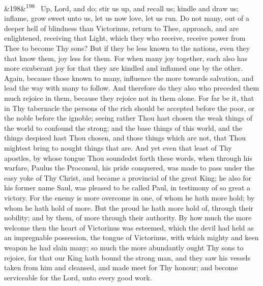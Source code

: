 \documentclass[12pt]{article}
\newcommand{\para}[1][]{\par\noindent\ifx&#1&\else\textsuperscript{\footnotesize #1}~\fi}
\begin{document}
\para[198] Up, Lord, and do; stir us up, and recall us; kindle and draw us; inflame, grow sweet unto us, let us now love, let us run. Do not many, out of a deeper hell of blindness than Victorinus, return to Thee, approach, and are enlightened, receiving that Light, which they who receive, receive power from Thee to become Thy sons? But if they be less known to the nations, even they that know them, joy less for them. For when many joy together, each also has more exuberant joy for that they are kindled and inflamed one by the other. Again, because those known to many, influence the more towards salvation, and lead the way with many to follow. And therefore do they also who preceded them much rejoice in them, because they rejoice not in them alone. For far be it, that in Thy tabernacle the persons of the rich should be accepted before the poor, or the noble before the ignoble; seeing rather Thou hast chosen the weak things of the world to confound the strong; and the base things of this world, and the things despised hast Thou chosen, and those things which are not, that Thou mightest bring to nought things that are. And yet even that least of Thy apostles, by whose tongue Thou soundedst forth these words, when through his warfare, Paulus the Proconsul, his pride conquered, was made to pass under the easy yoke of Thy Christ, and became a provincial of the great King; he also for his former name Saul, was pleased to be called Paul, in testimony of so great a victory. For the enemy is more overcome in one, of whom he hath more hold; by whom he hath hold of more. But the proud he hath more hold of, through their nobility; and by them, of more through their authority. By how much the more welcome then the heart of Victorinus was esteemed, which the devil had held as an impregnable possession, the tongue of Victorinus, with which mighty and keen weapon he had slain many; so much the more abundantly ought Thy sons to rejoice, for that our King hath bound the strong man, and they saw his vessels taken from him and cleansed, and made meet for Thy honour; and become serviceable for the Lord, unto every good work.
\end{document}
